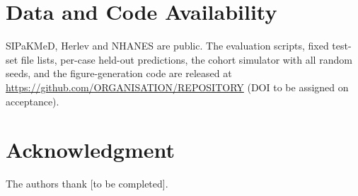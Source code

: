 \documentclass[lettersize,journal]{IEEEtran}
\begin{document}
\section*{Data and Code Availability}
SIPaKMeD, Herlev and NHANES are public. The evaluation scripts, fixed test-set file lists, per-case held-out predictions, the cohort simulator with all random seeds, and the figure-generation code are released at \url{https://github.com/ORGANISATION/REPOSITORY} (DOI to be assigned on acceptance).

\section*{Acknowledgment}
The authors thank [to be completed].



\end{document}
